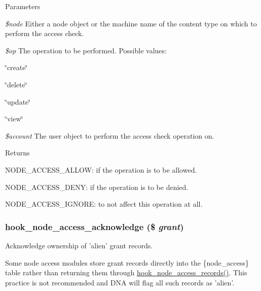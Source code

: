 \begin{DoxyParams}{Parameters}
\item[{\em \$node}]Either a node object or the machine name of the content type on which to perform the access check. \item[{\em \$op}]The operation to be performed. Possible values:
\begin{DoxyItemize}
\item \char`\"{}create\char`\"{}
\item \char`\"{}delete\char`\"{}
\item \char`\"{}update\char`\"{}
\item \char`\"{}view\char`\"{} 
\end{DoxyItemize}\item[{\em \$account}]The user object to perform the access check operation on.\end{DoxyParams}
\begin{DoxyReturn}{Returns}

\begin{DoxyItemize}
\item NODE\_\-ACCESS\_\-ALLOW: if the operation is to be allowed.
\item NODE\_\-ACCESS\_\-DENY: if the operation is to be denied.
\item NODE\_\-ACCESS\_\-IGNORE: to not affect this operation at all. 
\end{DoxyItemize}
\end{DoxyReturn}
\hypertarget{group__node__access_gac5a197ac3564b867c2921fb496063ae6}{
\subsubsection[{hook\_\-node\_\-access\_\-acknowledge}]{\setlength{\rightskip}{0pt plus 5cm}hook\_\-node\_\-access\_\-acknowledge (\$ {\em grant})}}
\label{group__node__access_gac5a197ac3564b867c2921fb496063ae6}
Acknowledge ownership of 'alien' grant records.

Some node access modules store grant records directly into the \{node\_\-access\} table rather than returning them through \hyperlink{group__node__access_ga3fe7744d74446e40e9b9ad2a782b4269}{hook\_\-node\_\-access\_\-records()}. This practice is not recommended and DNA will flag all such records as 'alien'.

